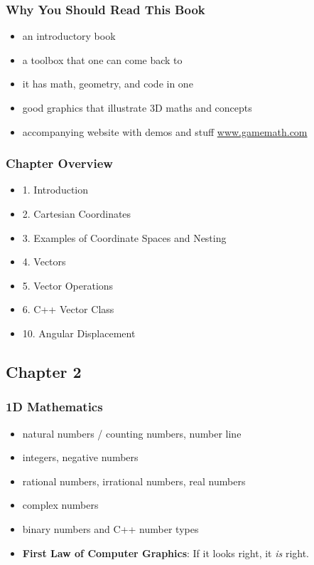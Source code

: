 \documentclass[a4paper,11pt]{amsart}
\begin{document}
\subsubsection{Why You Should Read This Book}
\begin{itemize}
    \item an introductory book
    \item a toolbox that one can come back to
    \item it has math, geometry, and code in one
    \item good graphics that illustrate 3D maths and concepts
    \item accompanying website with demos and stuff \url{www.gamemath.com}
\end{itemize}

\subsubsection{Chapter Overview}
\begin{itemize}
    \item 1. Introduction
    \item 2. Cartesian Coordinates
    \item 3. Examples of Coordinate Spaces and Nesting
    \item 4. Vectors
    \item 5. Vector Operations
    \item 6. C++ Vector Class
    \item 10. Angular Displacement
\end{itemize}

\subsection{Chapter 2}

\subsubsection{1D Mathematics}
\begin{itemize}
    \item natural numbers / counting numbers, number line
    \item integers, negative numbers
    \item rational numbers, irrational numbers, real numbers
    \item complex numbers
    \item binary numbers and C++ number types
    \item \textbf{First Law of Computer Graphics}: If it looks right, it
        \textit{is} right.
\end{itemize}
\end{document}
